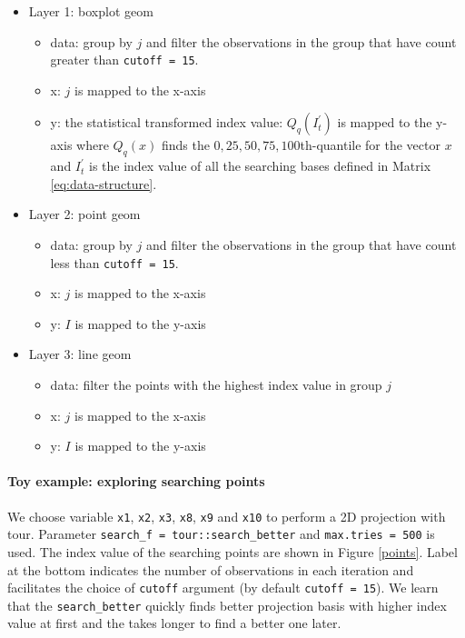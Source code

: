 \documentclass[12pt]{article}
\providecommand{\tightlist}{%
  \setlength{\itemsep}{0pt}\setlength{\parskip}{0pt}}
\begin{document}
\begin{itemize}
\tightlist
\item
  Layer 1: boxplot geom

  \begin{itemize}
  \tightlist
  \item
    data: group by \(j\) and filter the observations in the group that
    have count greater than \texttt{cutoff\ =\ 15}.
  \item
    x: \(j\) is mapped to the x-axis
  \item
    y: the statistical transformed index value: \(Q_q(I^{\prime}_t)\) is
    mapped to the y-axis where \(Q_q(x)\) finds the
    \(0, 25, 50, 75, 100\)th-quantile for the vector \(x\) and
    \(I^{\prime}_t\) is the index value of all the searching bases
    defined in Matrix \ref{eq:data-structure}.
  \end{itemize}
\item
  Layer 2: point geom

  \begin{itemize}
  \tightlist
  \item
    data: group by \(j\) and filter the observations in the group that
    have count less than \texttt{cutoff\ =\ 15}.
  \item
    x: \(j\) is mapped to the x-axis
  \item
    y: \(I\) is mapped to the y-axis
  \end{itemize}
\item
  Layer 3: line geom

  \begin{itemize}
  \tightlist
  \item
    data: filter the points with the highest index value in group \(j\)
  \item
    x: \(j\) is mapped to the x-axis
  \item
    y: \(I\) is mapped to the y-axis
  \end{itemize}
\end{itemize}

\hypertarget{toy-example-exploring-searching-points}{%
\paragraph{Toy example: exploring searching
points}\label{toy-example-exploring-searching-points}}

We choose variable \texttt{x1}, \texttt{x2}, \texttt{x3}, \texttt{x8},
\texttt{x9} and \texttt{x10} to perform a 2D projection with tour.
Parameter \texttt{search\_f\ =\ tour::search\_better} and
\texttt{max.tries\ =\ 500} is used. The index value of the searching
points are shown in Figure \ref{points}. Label at the bottom indicates
the number of observations in each iteration and facilitates the choice
of \texttt{cutoff} argument (by default \texttt{cutoff\ =\ 15}). We
learn that the \texttt{search\_better} quickly finds better projection
basis with higher index value at first and the takes longer to find a
better one later.
\end{document}

